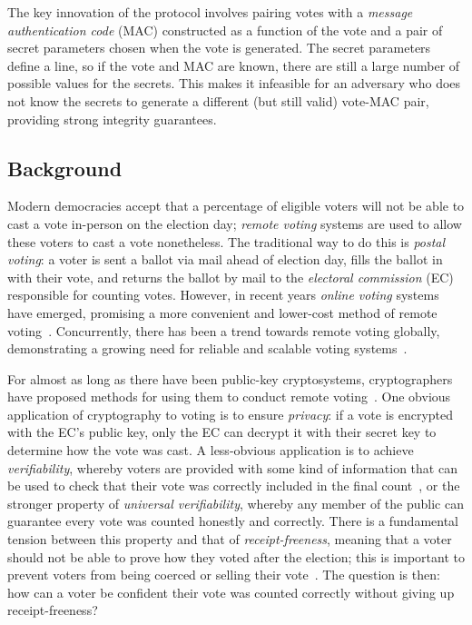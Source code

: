 \documentclass[12pt,a4paper]{article}
\theoremstyle{definition}
\begin{document}
The key innovation of the protocol involves pairing votes with a \textit{message authentication code} (MAC) constructed as a function of the vote and a pair of secret parameters chosen when the vote is generated. The secret parameters define a line, so if the vote and MAC are known, there are still a large number of possible values for the secrets. This makes it infeasible for an adversary who does not know the secrets to generate a different (but still valid) vote-MAC pair, providing strong integrity guarantees.

\subsection{Background}\label{sec-background}
Modern democracies accept that a percentage of eligible voters will not be able to cast a vote in-person on the election day; \textit{remote voting} systems are used to allow these voters to cast a vote nonetheless. The traditional way to do this is \textit{postal voting}: a voter is sent a ballot via mail ahead of election day, fills the ballot in with their vote, and returns the ballot by mail to the \textit{electoral commission} (EC) responsible for counting votes. However, in recent years \textit{online voting} systems have emerged, promising a more convenient and lower-cost method of remote voting~\cite{nswivote,scytlsvote}. Concurrently, there has been a trend towards remote voting globally, demonstrating a growing need for reliable and scalable voting systems~\cite{VEC_PostalVoting_Position,rallings2010,gjosteen2011norwegian}.

For almost as long as there have been public-key cryptosystems, cryptographers have proposed methods for using them to conduct remote voting~\cite{cohen1985robust}. One obvious application of cryptography to voting is to ensure \textit{privacy}: if a vote is encrypted with the EC's public key, only the EC can decrypt it with their secret key to determine how the vote was cast. A less-obvious application is to achieve \textit{verifiability}, whereby voters are provided with some kind of information that can be used to check that their vote was correctly included in the final count~\cite{benaloh1987verifiable}, or the stronger property of \textit{universal verifiability}, whereby any member of the public can guarantee every vote was counted honestly and correctly. There is a fundamental tension between this property and that of \textit{receipt-freeness}, meaning that a voter should not be able to prove how they voted after the election; this is important to prevent voters from being coerced or selling their vote~\cite{benaloh1994receipt}. The question is then: how can a voter be confident their vote was counted correctly without giving up receipt-freeness?
\end{document}
